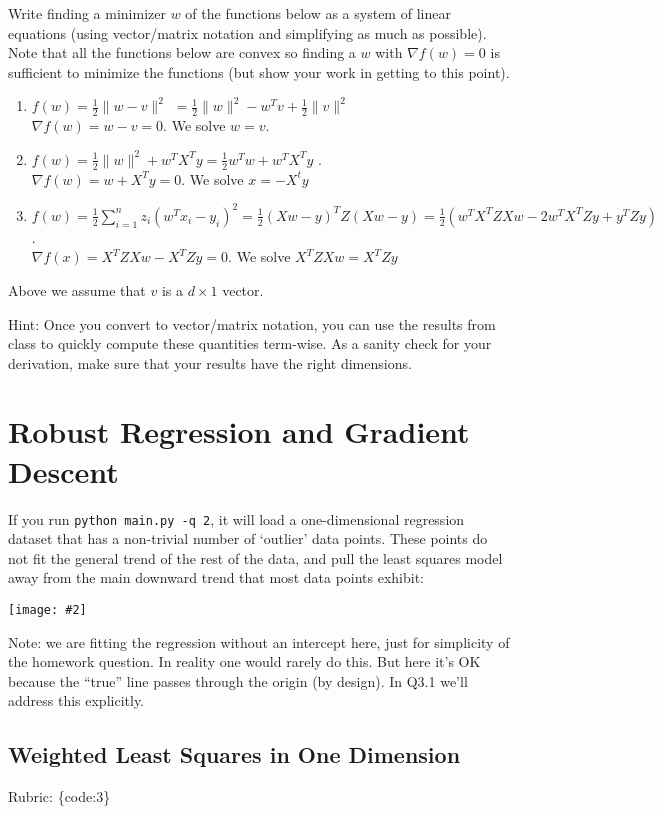 \documentclass{article}
\def\rubric#1{\gre{Rubric: \{#1\}}}{}
\def\blu#1{{\color{blu}#1}}
\def\gre#1{{\color{gre}#1}}
\def\norm#1{\|#1\|}
\newcommand{\centerfig}[2]{\begin{center}\texttt{[image: \#2]}\end{center}}
\def\enum#1{\begin{enumerate}#1\end{enumerate}}
\begin{document}
Write finding a minimizer $w$ of the functions below as a system of linear equations (using vector/matrix notation and simplifying as much as possible). Note that all the functions below are convex  so finding a $w$ with $\nabla f(w) = 0$ is sufficient to minimize the functions (but show your work in getting to this point).
\blu{\enum{
\item $f(w) = \frac{1}{2}\norm{w-v}^2$
\textbf{$=\frac{1}{2}\norm{w}^2-w^Tv+\frac{1}{2}\norm{v}^2$}\\
$\nabla f(w)=w-v=0$. We solve $w=v$.
\item $f(w) = \frac{1}{2}\norm{w}^2 + w^TX^Ty=\frac{1}{2}w^Tw+w^TX^Ty$ .\\
$\nabla f(w)=w+X^Ty=0$. We solve $x=-X^ty$
\item $f(w) = \frac{1}{2}\sum_{i=1}^n z_i (w^Tx_i - y_i)^2=\frac{1}{2}(Xw-y)^TZ(Xw-y)=\frac{1}{2}(w^TX^TZXw-2w^TX^TZy+y^TZy)$.\\
$\nabla f(x)=X^TZXw-X^TZy=0$. We solve $X^TZXw=X^TZy$
}}
Above we assume that $v$ is a $d \times 1$ vector. 

Hint: Once you convert to vector/matrix notation, you can use the results from class to quickly compute these quantities term-wise.
As a sanity check for your derivation, make sure that your results have the right dimensions.


\section{Robust Regression and Gradient Descent}

If you run \verb|python main.py -q 2|, it will load a one-dimensional regression
dataset that has a non-trivial number of `outlier' data points.
These points do not fit the general trend of the rest of the data,
and pull the least squares model away from the main downward trend that most data points exhibit:
\centerfig{.7}{../figs/least_squares_outliers.pdf}

Note: we are fitting the regression without an intercept here, just for simplicity of the homework question.
In reality one would rarely do this. But here it's OK because the ``true'' line 
passes through the origin (by design). In Q3.1 we'll address this explicitly.

\subsection{Weighted Least Squares in One Dimension}
\rubric{code:3}
\end{document}
